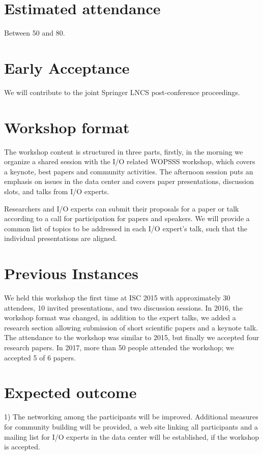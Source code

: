 \documentclass[a4paper,10pt]{article}
\begin{document}
\section{Estimated attendance}
Between 50 and 80.

\section{Early Acceptance}

We will contribute to the joint Springer LNCS post-conference proceedings.


\section{Workshop format}
The workshop content is structured in three parts, firstly, in the morning we organize a shared session with the I/O related WOPSSS workshop, which covers a keynote, best papers and community activities.
The afternoon session puts an emphasis on issues in the data center and covers paper presentations, discussion slots, and talks from I/O experts.

Researchers and I/O experts can submit their proposals for a paper or talk according to a call for participation for papers and speakers.
We will provide a common list of topics to be addressed in each I/O expert's talk, such that the individual presentations are aligned.


\section{Previous Instances}
We held this workshop the first time at ISC 2015 with approximately 30 attendees, 10 invited presentations, and two discussion sessions.
In 2016, the workshop format was changed, in addition to the expert talks, we added a research section allowing submission of short scientific papers and a keynote talk.
The attendance to the workshop was similar to 2015, but finally we accepted four research papers.
In 2017, more than 50 people attended the workshop; we accepted 5 of 6 papers.

\section{Expected outcome}
1) The networking among the participants will be improved.
Additional measures for community building will be provided, a web site linking all participants and a mailing list for I/O experts in the data center will be established, if the workshop is accepted.
\end{document}

